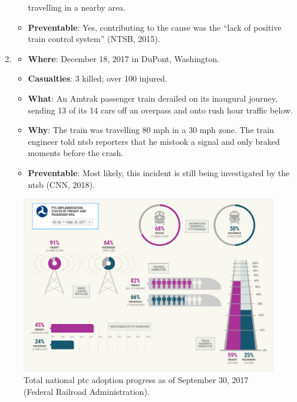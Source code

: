 \documentclass[11pt, titlepage]{article}
\begin{document}
\begin{enumerate}
\begin{itemize}
        travelling in a nearby area.
        \item \textbf{Preventable}: Yes, contributing to the cause was the ``lack
        of positive train control system'' (NTSB, 2015).
    \end{itemize}
    \item
    \begin{itemize}
        \item \textbf{Where}: December 18, 2017 in DuPont, Washington.
        \item \textbf{Casualties}: 3 killed; over 100 injured.
        \item \textbf{What}: An Amtrak passenger train derailed on its inaugural
        journey, sending 13 of its 14 cars off an overpass and onto rush hour
        traffic below.
        \item \textbf{Why}: The train was travelling 80 mph in a 30 mph zone. The
        train engineer told \gls{ntsb} reporters that he mistook a signal and
        only braked moments before the crash.
        \item \textbf{Preventable}: Most likely, this incident is still being
        investigated by the \gls{ntsb} (CNN, 2018).
    \end{itemize}
\end{enumerate}

\begin{figure}[ht]
    \begin{center}
        \includegraphics[width=\textwidth]{PTCAdoption.png}
        \captionsetup{justification=centering}
        \caption{Total national \gls{ptc} adoption progress as of September 30, 2017
        (Federal Railroad Administration).}
        \label{adoption}
    \end{center}
\end{figure}
\end{document}
